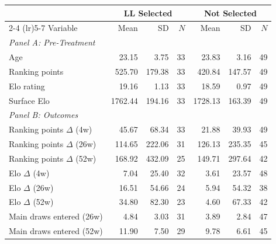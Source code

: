 \begin{tabular}{p{4cm} rrr rrr}
\toprule
 & \multicolumn{3}{c}{LL Selected} & \multicolumn{3}{c}{Not Selected} \\
\cmidrule(lr){2-4} \cmidrule(lr){5-7}
Variable & Mean & SD & $N$ & Mean & SD & $N$ \\
\midrule
\multicolumn{7}{l}{\textit{Panel A: Pre-Treatment}} \\
\quad Age & 23.15 & 3.75 & 33 & 23.83 & 3.16 & 49 \\
\quad Ranking points & 525.70 & 179.38 & 33 & 420.84 & 147.57 & 49 \\
\quad Elo rating & 19.16 & 1.13 & 33 & 18.59 & 0.97 & 49 \\
\quad Surface Elo & 1762.44 & 194.16 & 33 & 1728.13 & 163.39 & 49 \\
\midrule
\multicolumn{7}{l}{\textit{Panel B: Outcomes}} \\
\quad Ranking points $\Delta$ (4w) & 45.67 & 68.34 & 33 & 21.88 & 39.93 & 49 \\
\quad Ranking points $\Delta$ (26w) & 114.65 & 222.06 & 31 & 126.13 & 235.35 & 45 \\
\quad Ranking points $\Delta$ (52w) & 168.92 & 432.09 & 25 & 149.71 & 297.64 & 42 \\
\quad Elo $\Delta$ (4w) & 7.04 & 25.40 & 32 & 3.61 & 23.57 & 48 \\
\quad Elo $\Delta$ (26w) & 16.51 & 54.66 & 24 & 5.94 & 54.32 & 38 \\
\quad Elo $\Delta$ (52w) & 34.80 & 82.30 & 23 & 4.60 & 67.33 & 42 \\
\quad Main draws entered (26w) & 4.84 & 3.03 & 31 & 3.89 & 2.84 & 47 \\
\quad Main draws entered (52w) & 11.90 & 7.50 & 29 & 9.78 & 6.61 & 45 \\
\bottomrule
\end{tabular}
